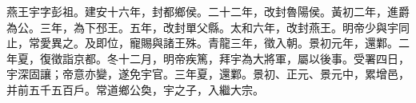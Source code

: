 
\begin{pinyinscope}
燕王宇字彭祖。建安十六年，封都鄉侯。二十二年，改封魯陽侯。黃初二年，進爵為公。三年，為下邳王。五年，改封單父縣。太和六年，改封燕王。明帝少與宇同止，常愛異之。及即位，寵賜與諸王殊。青龍三年，徵入朝。景初元年，還鄴。二年夏，復徵詣京都。冬十二月，明帝疾篤，拜宇為大將軍，屬以後事。受署四日，宇深固讓；帝意亦變，遂免宇官。三年夏，還鄴。景初、正元、景元中，累增邑，并前五千五百戶。常道鄉公奐，宇之子，入繼大宗。


\end{pinyinscope}